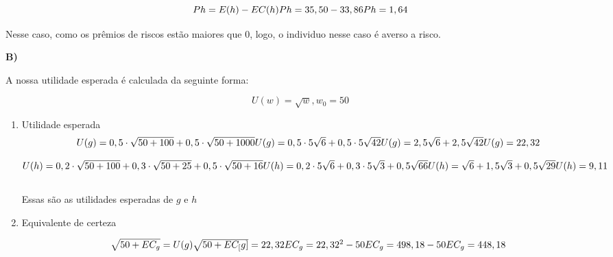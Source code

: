 \begin{flushleft}
\begin{enumerate}
	\begin{equation}
		Ph = E(h) - EC(h)
		$$\\$$
		Ph = 35,50 - 33,86
		$$\\$$
		Ph = 1,64 
	\end{equation}
	
	Nesse caso, como os prêmios de riscos estão maiores que 0, logo, o individuo nesse caso é averso a risco.
\end{enumerate}

\singlespacing

\textbf{B)}

A nossa utilidade esperada é calculada da seguinte forma:

\begin{equation}
U(w) = \sqrt{w} ,   w_{0} = 50
\end{equation}

\begin{enumerate}
	\item Utilidade esperada
	\begin{equation}
	U(g) = 0,5 \cdot \sqrt{50 + 100} + 0,5 \cdot \sqrt{50 + 1000}
	$$\\$$
	U(g) = 0,5 \cdot 5\sqrt{6}  + 0,5 \cdot 5 \sqrt{42}
	$$\\$$
	U(g) = 2,5 \sqrt{6} + 2,5\sqrt{42}
	$$\\$$
	U(g) = 22,32
	\end{equation}
	
	\begin{equation}
	U(h) = 0,2 \cdot \sqrt{50 + 100} + 0,3 \cdot \sqrt{50 + 25} + 0,5 \cdot \sqrt{50 + 16}
	$$\\$$
	U(h) = 0,2 \cdot 5\sqrt{6}  + 0,3 \cdot 5 \sqrt{3} + 0,5\sqrt{66}
	$$\\$$
	U(h) =  \sqrt{6} + 1,5\sqrt{3} + 0,5 \sqrt{29}
	$$\\$$
	U(h) = 9,11
	\end{equation}
	\\ Essas são as utilidades esperadas de $g$ e $h$
	
	\item Equivalente de certeza
	
	\begin{equation}
	\sqrt{50 + EC_{g}} = U(g)
	$$\\$$
	\sqrt{50 + EC_[g]} = 22,32
	$$\\$$
	EC_{g} = 22,32^{2} - 50
	$$\\$$
	EC_{g} = 498,18 - 50
	$$\\$$
	EC_{g} = 448,18
	\end{equation}
	

\end{enumerate}
\end{flushleft}
